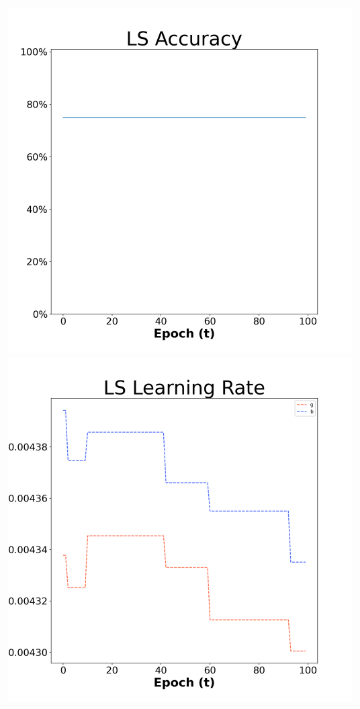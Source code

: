 \begin{figure}[H]
    \centering %
\begin{subfigure}{0.3\textwidth}
  \includegraphics[width=\linewidth]{images/exper1/Ionosphere/LS_0.01_acc.png}
    \includegraphics[width=\linewidth]{images/exper1/Ionosphere/LS_0.01_lr.png}

\end{subfigure}
\end{figure}
